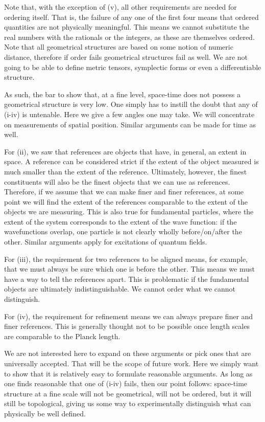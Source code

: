 \documentclass[12pt]{iopart}
\begin{document}
Note that, with the exception of (v), all other requirements are needed for ordering itself. That is, the failure of any one of the first four means that ordered quantities are not physically meaningful. This means we cannot substitute the real numbers with the rationals or the integers, as these are themselves ordered. Note that all geometrical structures are based on some notion of numeric distance, therefore if order fails geometrical structures fail as well. We are not going to be able to define metric tensors, symplectic forms or even a differentiable structure.

As such, the bar to show that, at a fine level, space-time does not possess a geometrical structure is very low. One simply has to instill the doubt that any of (i-iv) is untenable. Here we give a few angles one may take. We will concentrate on measurements of spatial position. Similar arguments can be made for time as well.

For (ii), we saw that references are objects that have, in general, an extent in space. A reference can be considered strict if the extent of the object measured is much smaller than the extent of the reference. Ultimately, however, the finest constituents will also be the finest objects that we can use as references. Therefore, if we assume that we can make finer and finer references, at some point we will find the extent of the references comparable to the extent of the objects we are measuring. This is also true for fundamental particles, where the extent of the system corresponds to the extent of the wave function: if the wavefunctions overlap, one particle is not clearly wholly before/on/after the other. Similar arguments apply for excitations of quantum fields.

For (iii), the requirement for two references to be aligned means, for example, that we must always be sure which one is before the other. This means we must have a way to tell the references apart. This is problematic if the fundamental objects are ultimately indistinguishable. We cannot order what we cannot distinguish.

For (iv), the requirement for refinement means we can always prepare finer and finer references. This is generally thought not to be possible once length scales are comparable to the Planck length.

We are not interested here to expand on these arguments or pick ones that are universally accepted. That will be the scope of future work. Here we simply want to show that it is relatively easy to formulate reasonable arguments. As long as one finds reasonable that one of (i-iv) fails, then our point follows: space-time structure at a fine scale will not be geometrical, will not be ordered, but it will still be topological, giving us some way to experimentally distinguish what can physically be well defined.
\end{document}
